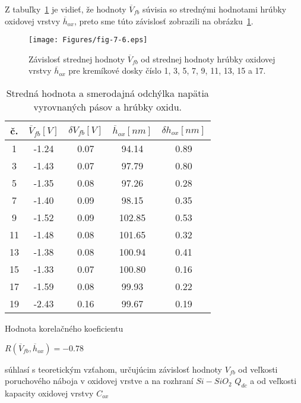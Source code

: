 Z tabuľky~\ref{tab:7.4} je vidieť, že hodnoty $\overline V_{fb}$
súvisia so strednými hodnotami hrúbky oxidovej vrstvy $\overline
h_{ox}$, preto sme túto závislosť zobrazili na obrázku~\ref{fig:7.6}.

\newpage
\begin{figure}[h!]\centering
  \texttt{[image: Figures/fig-7-6.eps]}
  \caption[Závislosť strednej hodnoty $\overline V_{fb}$ od strednej
    hodnoty hrúbky oxidovej vrstvy $\overline h_{ox}$]{Závislosť
    strednej hodnoty $\overline V_{fb}$ od strednej hodnoty hrúbky
    oxidovej vrstvy $\overline h_{ox}$ pre kremíkové dosky číslo 1, 3,
    5, 7, 9, 11, 13, 15 a 17.}\label{fig:7.6}
\end{figure}

\begin{table}[h!]\centering
  \begin{tabular}{c c c c c}
    č. & $\overline V_{fb} [V]$ & $\delta V_{fb} [V]$ & $\overline h_{ox} [nm]$ & $\delta h_{ox} [nm]$\\ 
    \hline
     1 & -1.24 & 0.07 &  94.14 & 0.89\\
     3 & -1.43 & 0.07 &  97.79 & 0.80\\
     5 & -1.35 & 0.08 &  97.26 & 0.28\\
     7 & -1.40 & 0.09 &  98.15 & 0.35\\
     9 & -1.52 & 0.09 & 102.85 & 0.53\\
    11 & -1.48 & 0.08 & 101.65 & 0.32\\
    13 & -1.38 & 0.08 & 100.94 & 0.41\\
    15 & -1.33 & 0.07 & 100.80 & 0.16\\
    17 & -1.59 & 0.08 &  99.93 & 0.22\\
    19 & -2.43 & 0.16 &  99.67 & 0.19\\
  \end{tabular}
  \caption[Stredná hodnota a smerodajná odchýlka napätia vyrovnaných
    pásov a hrúbky oxidu]{Stredná hodnota a smerodajná odchýlka
    napätia vyrovnaných pásov a hrúbky oxidu.}\label{tab:7.4}
\end{table}

Hodnota korelačného koeficientu

\centerline{$R(\overline V_{fb} ,\overline h_{ox}) = -0.78$}

súhlasí s teoretickým vzťahom, určujúcim závislosť hodnoty $V_{fb}$ od
veľkosti poruchového náboja v oxidovej vrstve a na rozhraní
$Si-SiO_{2}$ $Q_{dc}$ a od veľkosti kapacity oxidovej vrstvy $C_{ox}$

